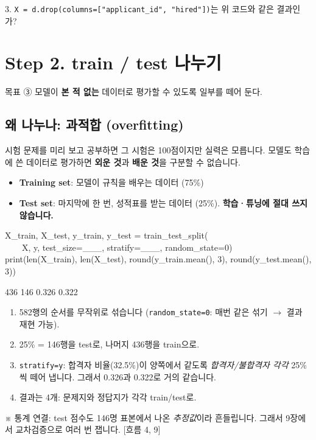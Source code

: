 \documentclass[11pt,a4paper]{article}
\newcommand{\term}[1]{\textbf{#1}}
\newcommand{\code}[1]{\texttt{#1}}
\newcommand{\aside}[1]{{\footnotesize\color{black!65}#1}}
\begin{document}
\begin{qbox}
3. \code{X = d.drop(columns=["applicant\_id", "hired"])}는 위 코드와 같은 결과인가?
\end{qbox}

\section{Step 2. train / test 나누기}
\begin{goalbox}{목표 \quad ③}
모델이 \textbf{본 적 없는} 데이터로 평가할 수 있도록 일부를 떼어 둔다.
\end{goalbox}

\subsection{왜 나누나: 과적합 (overfitting)}
시험 문제를 미리 보고 공부하면 그 시험은 100점이지만 실력은 모릅니다. 모델도 학습에 쓴 데이터로 평가하면 \textbf{외운 것}과 \textbf{배운 것}을 구분할 수 없습니다.
\begin{itemize}
\item \term{Training set}: 모델이 규칙을 배우는 데이터 (75\%)
\item \term{Test set}: 마지막에 한 번, 성적표를 받는 데이터 (25\%). \textbf{학습·튜닝에 절대 쓰지 않습니다.}
\end{itemize}

\begin{codebox}
X\_train, X\_test, y\_train, y\_test = train\_test\_split(\\
\ \ \ \ X, y, test\_size=\_\_\_, stratify=\_\_\_, random\_state=0)\\
print(len(X\_train), len(X\_test), round(y\_train.mean(), 3), round(y\_test.mean(), 3))
\end{codebox}
\begin{outbox}
436 146 0.326 0.322
\end{outbox}

\begin{howbox}
\begin{enumerate}
\item 582행의 순서를 무작위로 섞습니다 (\code{random\_state=0}: 매번 같은 섞기 $\to$ 결과 재현 가능).
\item 25\% = 146행을 test로, 나머지 436행을 train으로.
\item \code{stratify=y}: 합격자 비율(32.5\%)이 양쪽에서 같도록 \emph{합격자/불합격자 각각} 25\%씩 떼어 냅니다. 그래서 0.326과 0.322로 거의 같습니다.
\item 결과는 4개: 문제지와 정답지가 각각 train/test로.
\end{enumerate}
\end{howbox}
\aside{※ 통계 연결: test 점수도 146명 표본에서 나온 \emph{추정값}이라 흔들립니다. 그래서 9장에서 교차검증으로 여러 번 잽니다. [흐름 4, 9]}
\end{document}
